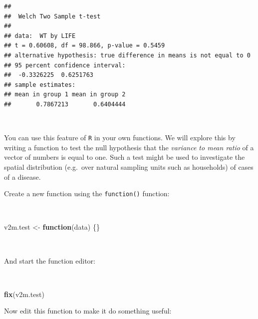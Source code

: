 \documentclass[12pt,a4paper]{book}
\newenvironment{Shaded}{\begin{snugshade}}{\end{snugshade}}
\newcommand{\ControlFlowTok}[1]{\textcolor[rgb]{0.13,0.29,0.53}{\textbf{#1}}}
\newcommand{\KeywordTok}[1]{\textcolor[rgb]{0.13,0.29,0.53}{\textbf{#1}}}
\newcommand{\NormalTok}[1]{#1}
\newcommand{\StringTok}[1]{\textcolor[rgb]{0.31,0.60,0.02}{#1}}
\theoremstyle{definition}
\theoremstyle{definition}
\theoremstyle{definition}
\theoremstyle{remark}
\begin{document}
\begin{verbatim}
## 
##  Welch Two Sample t-test
## 
## data:  WT by LIFE
## t = 0.60608, df = 98.866, p-value = 0.5459
## alternative hypothesis: true difference in means is not equal to 0
## 95 percent confidence interval:
##  -0.3326225  0.6251763
## sample estimates:
## mean in group 1 mean in group 2 
##       0.7867213       0.6404444
\end{verbatim}

~

You can use this feature of \texttt{R} in your own functions. We will
explore this by writing a function to test the null hypothesis that the
\emph{variance to mean ratio} of a vector of numbers is equal to one.
Such a test might be used to investigate the spatial distribution
(e.g.~over natural sampling units such as households) of cases of a
disease.

Create a new function using the \texttt{function()} function:

~

\begin{Shaded}
\begin{Highlighting}[]
\NormalTok{v2m.test <-}\StringTok{ }\ControlFlowTok{function}\NormalTok{(data) \{\}}
\end{Highlighting}
\end{Shaded}

~

And start the function editor:

~

\begin{Shaded}
\begin{Highlighting}[]
\KeywordTok{fix}\NormalTok{(v2m.test)}
\end{Highlighting}
\end{Shaded}

\newpage

Now edit this function to make it do something useful:

~
\end{document}

